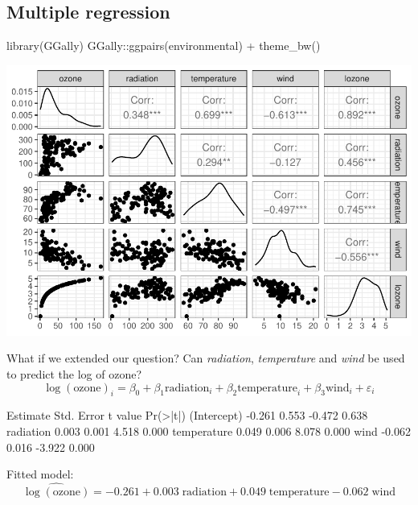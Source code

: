 \documentclass[a4paper]{article}
\begin{document}
\subsection{Multiple regression}
\begin{Schunk}
\begin{Sinput}
library(GGally)
GGally::ggpairs(environmental) + theme_bw()
\end{Sinput}


{\centering \includegraphics[width=\maxwidth]{figure/listings-unnamed-chunk-361-1} 

}

\end{Schunk}
What if we extended our question? Can \textit{radiation}, \textit{temperature} and \textit{wind} be used to predict the log of ozone?
\[
	\log(\text{ozone})_i = \beta_0 + \beta_1 \text{radiation}_i + \beta_2 \text{temperature}_i + \beta_3 \text{wind}_i + \varepsilon_i
\]
\begin{Schunk}
\begin{Soutput}
            Estimate Std. Error t value Pr(>|t|)
(Intercept)   -0.261      0.553  -0.472    0.638
radiation      0.003      0.001   4.518    0.000
temperature    0.049      0.006   8.078    0.000
wind          -0.062      0.016  -3.922    0.000
\end{Soutput}
\end{Schunk}
Fitted model:
\[
	\widehat{\log(\text{ozone})} = -0.261 + 0.003\; \text{radiation} + 0.049\; \text{temperature} - 0.062\; \text{wind}
\]
\end{document}
